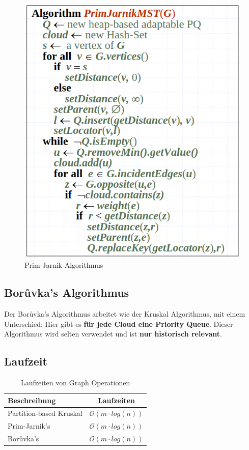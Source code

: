 \clearpage

\begin{figure}[ht!]
	\centering
	\begin{minipage}[t]{0.5\textwidth}
		\centering
		\includegraphics[width=\linewidth]{images/primjarnik}
		\caption{Prim-Jarnik Algorithmus}
		\label{fig:primjarnikaalg}
	\end{minipage}
\end{figure}

\subsection{Borůvka's Algorithmus}
Der Borůvka's Algorithmus arbeitet wie der Kruskal Algorithmus, mit einem Unterschied: Hier gibt es \textbf{für jede Cloud eine Priority Queue}. Dieser Algorithmus wird selten verwendet und ist \textbf{nur historisch relevant}.

\subsection{Laufzeit}
\begin{table}[h]
	\centering
	\begin{tabu} to \linewidth {l c}
		\toprule
		Beschreibung & Laufzeiten \\
		\midrule
		Partition-based Kruskal & $\mathcal{O}(m \cdot log(n))$\\
		Prim-Jarnik's & $\mathcal{O}(m \cdot log(n))$\\
		Borůvka's & $\mathcal{O}(m \cdot log(n))$\\
		\bottomrule
	\end{tabu}
	\caption{Laufzeiten von Graph Operationen}
\end{table}





